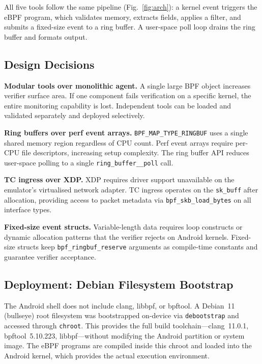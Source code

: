 \documentclass[conference]{IEEEtran}
\begin{document}
All five tools follow the same pipeline (Fig.~\ref{fig:arch}): a kernel event triggers the eBPF program, which validates memory, extracts fields, applies a filter, and submits a fixed-size event to a ring buffer. A user-space poll loop drains the ring buffer and formats output.

\subsection{Design Decisions}
\textbf{Modular tools over monolithic agent.} A single large BPF object increases verifier surface area. If one component fails verification on a specific kernel, the entire monitoring capability is lost. Independent tools can be loaded and validated separately and deployed selectively.

\textbf{Ring buffers over perf event arrays.} \texttt{BPF\_MAP\_TYPE\_RINGBUF} uses a single shared memory region regardless of CPU count. Perf event arrays require per-CPU file descriptors, increasing setup complexity. The ring buffer API reduces user-space polling to a single \texttt{ring\_buffer\_\_poll} call.

\textbf{TC ingress over XDP.} XDP requires driver support unavailable on the emulator's virtualised network adapter. TC ingress operates on the \texttt{sk\_buff} after allocation, providing access to packet metadata via \texttt{bpf\_skb\_load\_bytes} on all interface types.

\textbf{Fixed-size event structs.} Variable-length data requires loop constructs or dynamic allocation patterns that the verifier rejects on Android kernels. Fixed-size structs keep \texttt{bpf\_ringbuf\_reserve} arguments as compile-time constants and guarantee verifier acceptance.

\subsection{Deployment: Debian Filesystem Bootstrap}
The Android shell does not include clang, libbpf, or bpftool. A Debian~11 (bullseye) root filesystem was bootstrapped on-device via \texttt{debootstrap} and accessed through \texttt{chroot}. This provides the full build toolchain---clang~11.0.1, bpftool~5.10.223, libbpf---without modifying the Android partition or system image. The eBPF programs are compiled inside this chroot and loaded into the Android kernel, which provides the actual execution environment.

\end{document}

